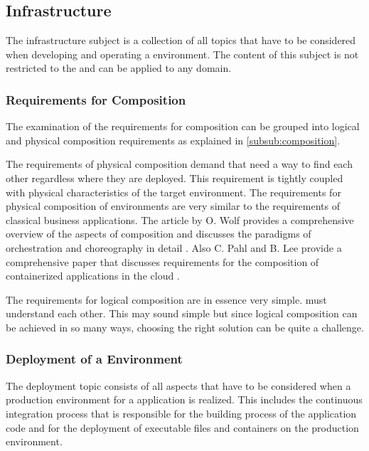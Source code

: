 \subsection{\ms{} Infrastructure}
\label{sub:infrastructure}

The \ms{} infrastructure subject is a collection of all topics that have to be
considered when developing and operating a \ms{} environment. The content of
this subject is not restricted to the \ogs{} and can be applied to any domain. 

\subsubsection{Requirements for \ms{} Composition}

The examination of the requirements for \ms{} composition can be grouped into
logical and physical composition requirements as explained in
\autoref{subsub:composition}.

The requirements of physical composition demand that \mss{} need a way to find
each other regardless where they are deployed. This requirement is tightly
coupled with physical characteristics of the target environment. The
requirements for physical composition of \ms{} \og{} environments are very
similar to the requirements of classical business applications. The article by
O. Wolf provides a comprehensive overview of the aspects of \ms{} composition
and discusses the paradigms of orchestration and choreography in detail
\cite{wolf_ms}. Also C. Pahl and B. Lee provide a comprehensive paper that
discusses requirements for the composition of containerized applications in the
cloud \cite{pahl2015containers}.

The requirements for logical composition are in essence very simple. \mss{} must
understand each other. This may sound simple but since logical composition can
be achieved in so many ways, choosing the right solution can be quite a
challenge.

\subsubsection{Deployment of a \ms{} Environment}

The deployment topic consists of all aspects that have to be considered when a
production environment for a \ms{} application is realized. This includes the
continuous integration process that is responsible for the building process of
the application code and for the deployment of executable files and containers
on the production environment.

